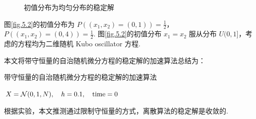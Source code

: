 \begin{figure}[!htbp]
	\centering 
	\vspace{.2cm}
	\caption{初值分布为均匀分布的稳定解}
	\label{fig.5.3}
\end{figure}

图\ref{fig.5.2}的初值分布为 $P((x_1,x_2) = (0,1) ) = \frac12$，$P((x_1,x_2) = (0,4) ) = \frac12$. 图\ref{fig.5.2}的初值分布 $x_1=x_2$ 服从分布 $U(0,1]$，考虑的方程均为二维随机 Kubo oscillator 方程. 

本文将带守恒量的自治随机微分方程的稳定解的加速算法总结为：
\begin{algorithm}[!htbp]
	\caption{带守恒量的自治随机微分方程的稳定解的加速算法}%
	\LinesNumbered %
	$X = \mathcal N(0,1,N),\quad h=0.1,\quad \rm{time} = 0$\;
\end{algorithm}

根据实验，本文推测通过限制守恒量的方式，离散算法的稳定解是收敛的. 




